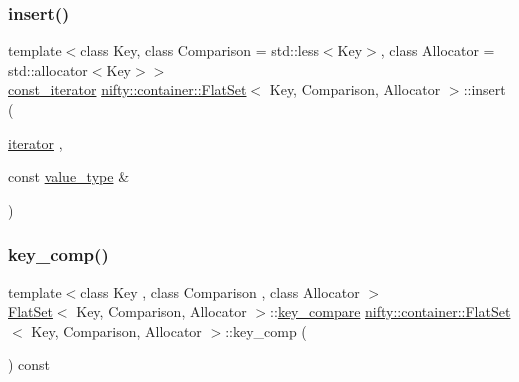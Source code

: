 \mbox{\label{classnifty_1_1container_1_1FlatSet_a603c16d2c24bd8b6190f688011dea171}} 
\subsubsection{\texorpdfstring{insert()}{insert()}\hspace{0.1cm}{\footnotesize\ttfamily [3/3]}}
{\footnotesize\ttfamily template$<$class Key, class Comparison = std\+::less$<$\+Key$>$, class Allocator = std\+::allocator$<$\+Key$>$$>$ \\
\hyperlink{classnifty_1_1container_1_1FlatSet_a0f4cd26da060859b18742abfd534aa24}{const\+\_\+iterator} \hyperlink{classnifty_1_1container_1_1FlatSet}{nifty\+::container\+::\+Flat\+Set}$<$ Key, Comparison, Allocator $>$\+::insert (\begin{DoxyParamCaption}\item[{\hyperlink{classnifty_1_1container_1_1FlatSet_a9c7fd20cd6b1878ccb8a7e068072c795}{iterator}}]{,  }\item[{const \hyperlink{classnifty_1_1container_1_1FlatSet_a2366c665ec49d585ff8a77362468d82d}{value\+\_\+type} \&}]{ }\end{DoxyParamCaption})}

\mbox{\label{classnifty_1_1container_1_1FlatSet_ae598feab5426ef294dee226d89a40672}} 
\subsubsection{\texorpdfstring{key\+\_\+comp()}{key\_comp()}}
{\footnotesize\ttfamily template$<$class Key , class Comparison , class Allocator $>$ \\
\hyperlink{classnifty_1_1container_1_1FlatSet}{Flat\+Set}$<$ Key, Comparison, Allocator $>$\+::\hyperlink{classnifty_1_1container_1_1FlatSet_ab88802e81d77a08a7a74e8ba9d2083c7}{key\+\_\+compare} \hyperlink{classnifty_1_1container_1_1FlatSet}{nifty\+::container\+::\+Flat\+Set}$<$ Key, Comparison, Allocator $>$\+::key\+\_\+comp (\begin{DoxyParamCaption}{ }\end{DoxyParamCaption}) const\hspace{0.3cm}{\ttfamily [inline]}}


